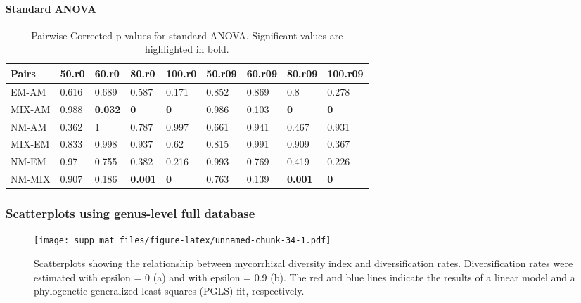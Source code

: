 \documentclass[]{article}
\let\oldparagraph\paragraph
\renewcommand{\paragraph}[1]{\oldparagraph{#1}\mbox{}}
\begin{document}
\hypertarget{standard-anova-7}{%
\paragraph{Standard ANOVA}\label{standard-anova-7}}

\begin{table}[H]

\caption{\label{tab:unnamed-chunk-33}Pairwise Corrected p-values for standard ANOVA. Significant values are highlighted in bold.}
\centering
\begin{tabular}{l|l|l|l|l|l|l|l|l}
\hline
Pairs & 50.r0 & 60.r0 & 80.r0 & 100.r0 & 50.r09 & 60.r09 & 80.r09 & 100.r09\\
\hline
EM-AM & 0.616 & 0.689 & 0.587 & 0.171 & 0.852 & 0.869 & 0.8 & 0.278\\
\hline
MIX-AM & 0.988 & \textbf{0.032} & \textbf{0} & \textbf{0} & 0.986 & 0.103 & \textbf{0} & \textbf{0}\\
\hline
NM-AM & 0.362 & 1 & 0.787 & 0.997 & 0.661 & 0.941 & 0.467 & 0.931\\
\hline
MIX-EM & 0.833 & 0.998 & 0.937 & 0.62 & 0.815 & 0.991 & 0.909 & 0.367\\
\hline
NM-EM & 0.97 & 0.755 & 0.382 & 0.216 & 0.993 & 0.769 & 0.419 & 0.226\\
\hline
NM-MIX & 0.907 & 0.186 & \textbf{0.001} & \textbf{0} & 0.763 & 0.139 & \textbf{0.001} & \textbf{0}\\
\hline
\end{tabular}
\end{table}

\hypertarget{scatterplots-using-genus-level-full-database}{%
\subsubsection{Scatterplots using genus-level full
database}\label{scatterplots-using-genus-level-full-database}}

\begin{figure}
\centering
\texttt{[image: supp\_mat\_files/figure-latex/unnamed-chunk-34-1.pdf]}
\caption{Scatterplots showing the relationship between mycorrhizal
diversity index and diversification rates. Diversification rates were
estimated with epsilon = 0 (a) and with epsilon = 0.9 (b). The red and
blue lines indicate the results of a linear model and a phylogenetic
generalized least squares (PGLS) fit, respectively.}
\end{figure}
\end{document}

